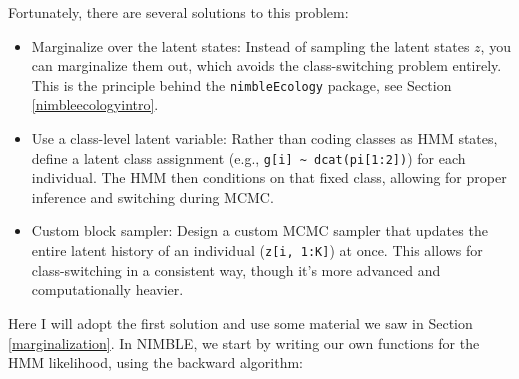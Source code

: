 \documentclass[
  12pt,
]{krantz}
\begin{document}
Fortunately, there are several solutions to this problem:

\begin{itemize}
\item
  Marginalize over the latent states: Instead of sampling the latent states \(z\), you can marginalize them out, which avoids the class-switching problem entirely. This is the principle behind the \texttt{nimbleEcology} package, see Section \ref{nimbleecologyintro}.
\item
  Use a class-level latent variable: Rather than coding classes as HMM states, define a latent class assignment (e.g., \texttt{g{[}i{]}\ \textasciitilde{}\ dcat(pi{[}1:2{]})}) for each individual. The HMM then conditions on that fixed class, allowing for proper inference and switching during MCMC.
\item
  Custom block sampler: Design a custom MCMC sampler that updates the entire latent history of an individual (\texttt{z{[}i,\ 1:K{]}}) at once. This allows for class-switching in a consistent way, though it's more advanced and computationally heavier.
\end{itemize}

Here I will adopt the first solution and use some material we saw in Section \ref{marginalization}. In NIMBLE, we start by writing our own functions for the HMM likelihood, using the backward algorithm:
\end{document}
